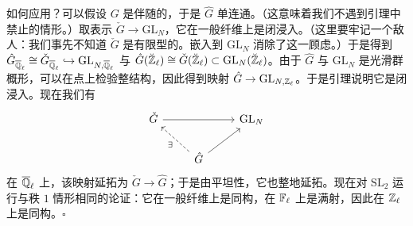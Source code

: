 如何应用？可以假设 $G$ 是伴随的，于是 $\hat G$ 单连通。（这意味着我们不遇到引理中禁止的情形。）取表示 $\check G\to\mathrm{GL}_N$，它在一般纤维上是闭浸入。（这里要牢记一个敌人：我们事先不知道 $\check G$ 是有限型的。嵌入到 $\mathrm{GL}_N$ 消除了这一顾虑。）于是得到 $\hat G_{\overline{\mathbb{Q}}_\ell}\cong\check G_{\overline{\mathbb{Q}}_\ell}\hookrightarrow\mathrm{GL}_{N,\overline{\mathbb{Q}}_\ell}$ 与 $\hat G(\breve{\mathbb{Z}}_\ell)\cong\check G(\breve{\mathbb{Z}}_\ell)\subset\mathrm{GL}_N(\breve{\mathbb{Z}}_\ell)$。由于 $\hat G$ 与 $\mathrm{GL}_N$ 是光滑群概形，可以在点上检验整结构，因此得到映射 $\hat G\to\mathrm{GL}_{N,\mathbb{Z}_\ell}$。于是引理说明它是闭浸入。现在我们有
\[
\begin{tikzcd}
\check G \arrow[rr] & & \mathrm{GL}_N \\
& \hat G \arrow[ul, dashed, "\exists"] \arrow[ur] &
\end{tikzcd}
\]
在 $\overline{\mathbb{Q}}_\ell$ 上，该映射延拓为 $\check G\to\hat G$；于是由平坦性，它也整地延拓。现在对 $\mathrm{SL}_2$ 运行与秩 $1$ 情形相同的论证：它在一般纤维上是同构，在 $\mathbb{F}_\ell$ 上是满射，因此在 $\mathbb{Z}_\ell$ 上是同构。\hfill$\square$
